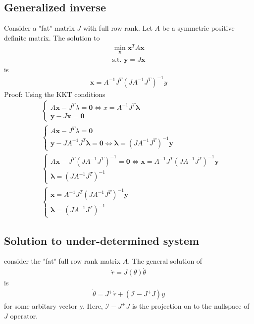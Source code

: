 \subsection{Generalized inverse}
Consider a "fat" matrix $J$ with full row rank. Let $A$ be a symmetric positive definite matrix. The solution to
\begin{equation}
\begin{aligned}
	\min_{\bm x} \bm{x}^T A \bm{x} \\
	\textrm{s.t. } \bm y = J \bm x
\end{aligned}
\end{equation}
is
\begin{align}
	\bm x = A^{-1} J^T\left(J A^{-1} J^T\right)^{-1} y
\end{align}
Proof:
Using the KKT conditions
\begin{align}
&\begin{cases}
	A\bm x - J^T \lambda = \bm 0 \iff x = A^{-1}J^T \bm \lambda \\
	\bm y - J \bm x = \bm 0
\end{cases} \\
&\begin{cases}
	A\bm x - J^T \lambda = \bm 0 \\
	\bm y - J A^{-1}J^T \bm \lambda = \bm 0 \iff \bm \lambda = \left(J A^{-1} J^T\right)^{-1} \bm y
\end{cases} \\
&\begin{cases}
	A\bm x - J^T \left(J A^{-1} J^T\right)^{-1} = \bm 0 \iff \bm x = A^{-1} J^T\left(J A^{-1} J^T\right)^{-1} \bm y \\
	\bm \lambda = \left(J A^{-1} J^T\right)^{-1}
\end{cases} \\
&\begin{cases}
	\bm x = A^{-1} J^T\left(J A^{-1} J^T\right)^{-1} \bm y \\
	\bm \lambda = \left(J A^{-1} J^T\right)^{-1}
\end{cases}
\end{align}

\subsection{Solution to under-determined system}
consider the "fat" full row rank matrix $A$. The general solution of 
\begin{align}
	\dot r = J(\theta) \dot\theta
\end{align}
is \cite{nakamura1987}
\begin{align}
	\dot \theta = J^+ \dot r + \left(\mathcal{I} - J^+J\right) y
\end{align}
for some arbitary vector y. Here, $\mathcal{I}-J^+J$ is the projection on to the nullspace of $J$ operator.


